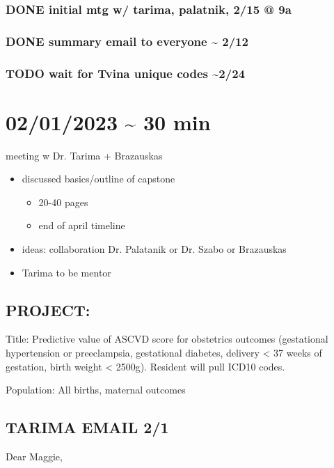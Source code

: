 \documentclass[11pt]{article}
\author{Maggie}
\date{\today}
\title{}
\begin{document}
\tableofcontents

\subsubsection{{\bfseries\sffamily DONE} initial mtg w/ tarima, palatnik, 2/15 @ 9a}
\label{sec:org2e03f92}
\subsubsection{{\bfseries\sffamily DONE} summary email to everyone \textasciitilde{} 2/12}
\label{sec:org03e7654}
\subsubsection{{\bfseries\sffamily TODO} wait for Tvina unique codes \textasciitilde{}2/24}
\label{sec:orgddd0142}


\section{02/01/2023 \textasciitilde{} 30 min}
\label{sec:org8e177b8}
meeting w Dr. Tarima + Brazauskas
\begin{itemize}
\item discussed basics/outline of capstone
\begin{itemize}
\item 20-40 pages
\item end of april timeline
\end{itemize}
\item ideas: collaboration Dr. Palatanik or Dr. Szabo or Brazauskas
\item Tarima to be mentor
\end{itemize}

\subsection{PROJECT:}
\label{sec:org5ab225c}
Title: Predictive value of ASCVD score for obstetrics outcomes  (gestational hypertension or preeclampsia, gestational diabetes, 
delivery < 37 weeks of gestation, birth weight < 2500g). Resident will pull ICD10 codes.

Population: All births, maternal outcomes

\subsection{TARIMA EMAIL 2/1}
\label{sec:orgb9c3b2c}
Dear Maggie,
\end{document}

